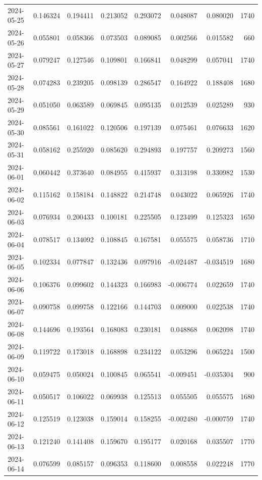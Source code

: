 \begin{tabular}{lrrrrrrr}
2024-05-25 & 0.146324 & 0.194411 & 0.213052 & 0.293072 & 0.048087 & 0.080020 & 1740 \\
2024-05-26 & 0.055801 & 0.058366 & 0.073503 & 0.089085 & 0.002566 & 0.015582 & 660 \\
2024-05-27 & 0.079247 & 0.127546 & 0.109801 & 0.166841 & 0.048299 & 0.057041 & 1740 \\
2024-05-28 & 0.074283 & 0.239205 & 0.098139 & 0.286547 & 0.164922 & 0.188408 & 1680 \\
2024-05-29 & 0.051050 & 0.063589 & 0.069845 & 0.095135 & 0.012539 & 0.025289 & 930 \\
2024-05-30 & 0.085561 & 0.161022 & 0.120506 & 0.197139 & 0.075461 & 0.076633 & 1620 \\
2024-05-31 & 0.058162 & 0.255920 & 0.085620 & 0.294893 & 0.197757 & 0.209273 & 1560 \\
2024-06-01 & 0.060442 & 0.373640 & 0.084955 & 0.415937 & 0.313198 & 0.330982 & 1530 \\
2024-06-02 & 0.115162 & 0.158184 & 0.148822 & 0.214748 & 0.043022 & 0.065926 & 1740 \\
2024-06-03 & 0.076934 & 0.200433 & 0.100181 & 0.225505 & 0.123499 & 0.125323 & 1650 \\
2024-06-04 & 0.078517 & 0.134092 & 0.108845 & 0.167581 & 0.055575 & 0.058736 & 1710 \\
2024-06-05 & 0.102334 & 0.077847 & 0.132436 & 0.097916 & -0.024487 & -0.034519 & 1680 \\
2024-06-06 & 0.106376 & 0.099602 & 0.144323 & 0.166983 & -0.006774 & 0.022659 & 1740 \\
2024-06-07 & 0.090758 & 0.099758 & 0.122166 & 0.144703 & 0.009000 & 0.022538 & 1740 \\
2024-06-08 & 0.144696 & 0.193564 & 0.168083 & 0.230181 & 0.048868 & 0.062098 & 1740 \\
2024-06-09 & 0.119722 & 0.173018 & 0.168898 & 0.234122 & 0.053296 & 0.065224 & 1500 \\
2024-06-10 & 0.059475 & 0.050024 & 0.100845 & 0.065541 & -0.009451 & -0.035304 & 900 \\
2024-06-11 & 0.050517 & 0.106022 & 0.069938 & 0.125513 & 0.055505 & 0.055575 & 1680 \\
2024-06-12 & 0.125519 & 0.123038 & 0.159014 & 0.158255 & -0.002480 & -0.000759 & 1740 \\
2024-06-13 & 0.121240 & 0.141408 & 0.159670 & 0.195177 & 0.020168 & 0.035507 & 1770 \\
2024-06-14 & 0.076599 & 0.085157 & 0.096353 & 0.118600 & 0.008558 & 0.022248 & 1770 \\

\end{tabular}
